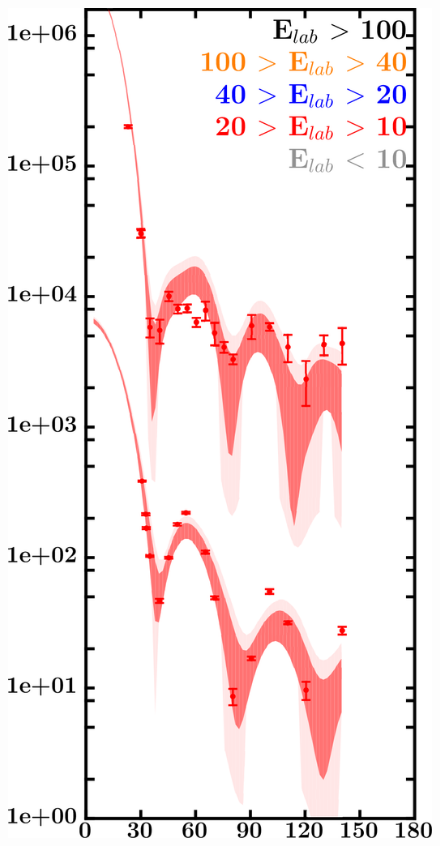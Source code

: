 \documentclass[twocolumn,secnumarabic,amssymb, nobibnotes, aps, prl,
superscriptaddress, nobalancelastpage, draft]{revtex4}
\begin{document}
\begin{figure}[!htb]
    \begin{minipage}{0.4\linewidth}
        \centering
        \includegraphics[width=\linewidth]{figures/sn112_neutronElastic.png}
        \label{DOM_sn112_neutron_elastic}
    \end{minipage}
    \centering
    \begin{minipage}{0.4\linewidth}

\end{minipage}
\end{figure}
\end{document}
